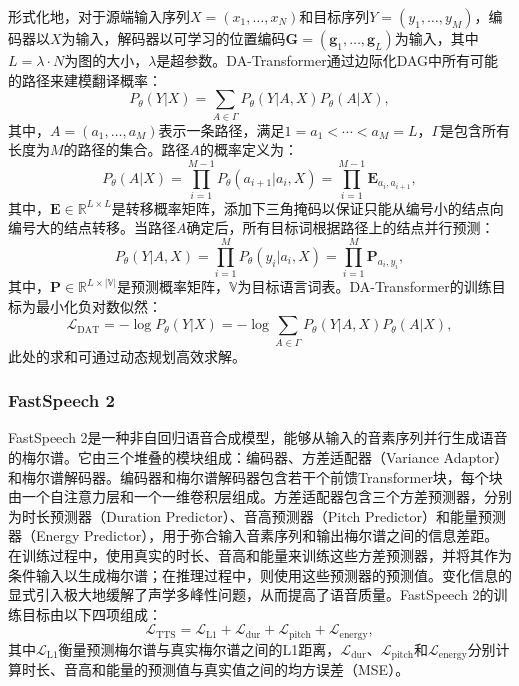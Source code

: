 形式化地，对于源端输入序列$X=(x_1, \ldots, x_N)$和目标序列$Y=(y_1, \ldots, y_M)$，编码器以$X$为输入，解码器以可学习的位置编码$\mathbf{G}=(\mathbf{g}_1, \ldots, \mathbf{g}_L)$为输入，其中$L=\lambda\cdot N$为图的大小，$\lambda$是超参数。DA-Transformer通过边际化DAG中所有可能的路径来建模翻译概率：
\begin{equation}
    P_\theta(Y|X)=\sum_{A\in\Gamma}P_\theta(Y|A, X)P_\theta(A|X),
\end{equation}
其中，$A=(a_1, \ldots, a_M)$表示一条路径，满足$1=a_1<\cdots<a_M=L$，$\Gamma$是包含所有长度为$M$的路径的集合。路径$A$的概率定义为：
\begin{equation}
    P_\theta(A|X)=\prod_{i=1}^{M-1}P_\theta(a_{i+1}|a_i, X)=\prod_{i=1}^{M-1}\mathbf{E}_{a_i,a_{i+1}},
\end{equation}
其中，$\mathbf{E}\in\mathbb{R}^{L\times L}$是转移概率矩阵，添加下三角掩码以保证只能从编号小的结点向编号大的结点转移。当路径$A$确定后，所有目标词根据路径上的结点并行预测：
\begin{equation}
    P_\theta(Y|A, X)=\prod_{i=1}^M P_\theta(y_i|a_i, X)=\prod_{i=1}^M \mathbf{P}_{a_i, y_i},
\end{equation}
其中，$\mathbf{P}\in\mathbb{R}^{L\times|\mathbb{V}|}$是预测概率矩阵，$\mathbb{V}$为目标语言词表。DA-Transformer的训练目标为最小化负对数似然：
\begin{equation}
    \mathcal{L}_{\text{DAT}}=-\log P_\theta(Y|X) = -\log \sum_{A\in\Gamma}P_\theta(Y|A, X)P_\theta(A|X),
    \label{eq:dat}
\end{equation}
此处的求和可通过动态规划高效求解。

\subsubsection{FastSpeech 2}

FastSpeech 2\citep{ren2021fastspeech2}是一种非自回归语音合成模型，能够从输入的音素序列并行生成语音的梅尔谱。它由三个堆叠的模块组成：编码器、方差适配器（Variance Adaptor）和梅尔谱解码器。编码器和梅尔谱解码器包含若干个前馈Transformer块，每个块由一个自注意力层和一个一维卷积层组成。方差适配器包含三个方差预测器，分别为时长预测器（Duration Predictor）、音高预测器（Pitch Predictor）和能量预测器（Energy Predictor），用于弥合输入音素序列和输出梅尔谱之间的信息差距。在训练过程中，使用真实的时长、音高和能量来训练这些方差预测器，并将其作为条件输入以生成梅尔谱；在推理过程中，则使用这些预测器的预测值。变化信息的显式引入极大地缓解了声学多峰性问题，从而提高了语音质量。FastSpeech 2的训练目标由以下四项组成：
\begin{equation}
    \mathcal{L}_{\text{TTS}}=\mathcal{L}_{\text{L1}}+\mathcal{L}_{\text{dur}}+\mathcal{L}_{\text{pitch}}+\mathcal{L}_{\text{energy}},
    \label{eq:tts}
\end{equation}
其中$\mathcal{L}_{\text{L1}}$衡量预测梅尔谱与真实梅尔谱之间的L1距离，$\mathcal{L}_{\text{dur}}$、$\mathcal{L}_{\text{pitch}}$和$\mathcal{L}_{\text{energy}}$分别计算时长、音高和能量的预测值与真实值之间的均方误差（MSE）。


